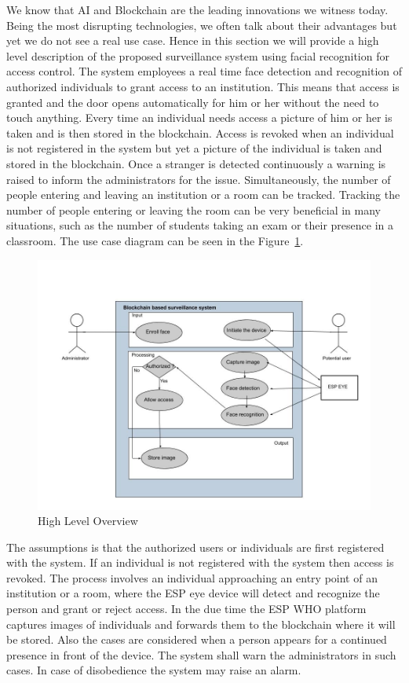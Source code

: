 We know that AI and Blockchain are the leading innovations we witness today. Being the most disrupting technologies, we often talk about their advantages but yet we do not see a real use case. Hence in this section we will provide a high level description of the proposed surveillance system using facial recognition for access control. The system employees a real time face detection and recognition of authorized individuals to grant access to an institution. This means that access is granted and the door opens automatically for him or her without the need to touch anything. Every time an individual needs access a picture of him or her is taken and is then stored in the blockchain. Access is revoked when an individual is not registered in the system but yet a picture of the individual is taken and stored in the blockchain. Once a stranger is detected continuously a warning is raised to inform the administrators for the issue. Simultaneously, the number of people entering and leaving an institution or a room can be tracked. Tracking the number of people entering or leaving the room can be very beneficial in many situations, such as the number of students taking an exam or their presence in a classroom. The use case diagram can be seen in the Figure~\ref{fig:use_case}. 

\begin{figure}[!htb]
    \centering
    \includegraphics[width=1\textwidth]{figures/use_case.jpg}
    \caption{High Level Overview}
    \label{fig:use_case}
\end{figure}


The assumptions is that the authorized users or individuals are first registered with the system. If an individual is not registered with the system then access is revoked. The process involves an individual approaching an entry point of an institution or a room, where the ESP eye device will detect and recognize the person and grant or reject access. In the due time the ESP WHO platform captures images of individuals and forwards them to the blockchain where it will be stored. Also the cases are considered when a person appears for a continued presence in front of the device. The system shall warn the administrators in such cases. In case of disobedience the system may raise an alarm. 






